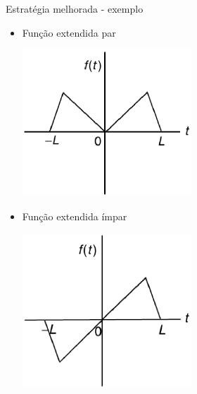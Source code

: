 \begin{slide}{Estratégia melhorada - exemplo}
{	      }{
	      	      \begin{itemize}
	      		      \item Função extendida par\\
				      \begin{center}
				      \includegraphics[width=0.5\textwidth]{figs/func-par}
				      \end{center}
			      \item Função extendida ímpar\\
				      \begin{center}
				      \includegraphics[width=0.5\textwidth]{figs/func-impar}
				      \end{center}
		      \end{itemize}
	      }
      \end{slide}

